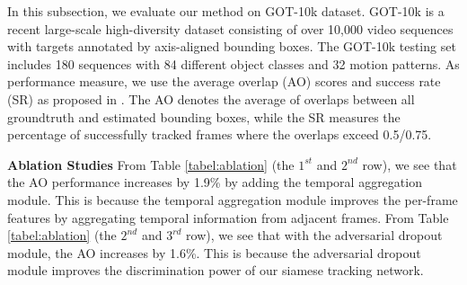 In this subsection, we evaluate our method on GOT-10k \cite{GOT-10k} dataset.
GOT-10k is a recent large-scale high-diversity dataset consisting of over 10,000 video sequences with targets annotated by axis-aligned bounding boxes. 
The GOT-10k testing set includes 180 sequences with 84 different object classes and 32 motion patterns. As performance measure, we use the average overlap (AO) scores and success rate (SR) as proposed in \cite{GOT-10k}. The AO denotes the average of overlaps between all groundtruth and estimated bounding boxes, while the SR measures the percentage of successfully tracked frames where the overlaps exceed 0.5/0.75.

\textbf{Ablation Studies}
From Table \ref{tabel:ablation} (the $1^{st}$ and $2^{nd}$ row), we see that the AO performance increases by 1.9\% by adding the temporal aggregation module.
This is because the temporal aggregation module improves the per-frame features by aggregating temporal information from adjacent frames.
From Table \ref{tabel:ablation} (the $2^{nd}$ and $3^{rd}$ row), we see that with the adversarial dropout module, the AO increases by 1.6\%.
This is because the adversarial dropout module improves the discrimination power of our siamese tracking network.

